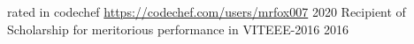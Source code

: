 \begin{cvhonors}
   \cvhonor
      {\faStar \faStar \faStar \faStar}{rated in codechef \url{https://codechef.com/users/mrfox007} }{}{2020}
   \cvhonor
      {Recipient of Scholarship}{ for meritorious performance in VITEEE-2016}
      {}{2016}
\end{cvhonors}
